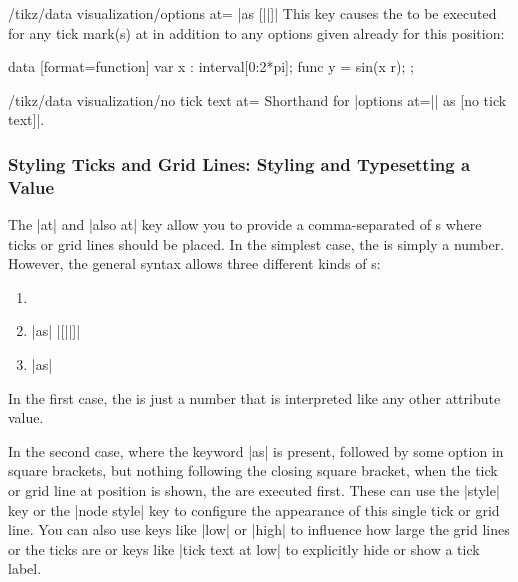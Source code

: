 \begin{key}{/tikz/data visualization/options at= |as [||]|}
  This key causes the  to be executed for any tick
  mark(s) at  in addition to any options given already for
  this position:
\begin{codeexample}[width=7cm]
\tikz \datavisualization [
  scientific axes,
  visualize as smooth line,
  x axis={ticks={major={
    options at = 3    as [no tick text],
    also at    = (pi) as
      [{tick text padding=1ex}] $\pi$}}}]
data [format=function] {
  var x : interval[0:2*pi];
  func y = sin(\value x r);
};
\end{codeexample}
\end{key}

\begin{key}{/tikz/data visualization/no tick text at=}
  Shorthand for |options at=|| as [no tick text]|.  
\end{key}



\subsubsection{Styling Ticks and Grid Lines: Styling and Typesetting a Value}

\label{section-dv-local-styles}
\label{section-dv-tick-labels}


The |at| and |also at| key allow you to provide a comma-separated
 of s where ticks or grid lines should be
placed. In the simplest case, the  is simply a
number. However, the general syntax allows three different kinds of
s: 

\begin{enumerate}
\item
\item
   |as| |[||]|
\item
   |as|  
\end{enumerate}

In the first case, the  is just a number that is
interpreted like any other attribute value.

In the second case, where the keyword |as| is present, followed by
some option in square brackets, but nothing following the closing
square bracket, when the tick or grid line at position  is
shown, the  are executed first. These can use the
|style| key or the |node style| key to configure the appearance of
this single tick or grid line. You can also use keys like |low| or
|high| to influence how large the grid lines or the ticks are or keys
like |tick text at low| to explicitly hide or show a tick label.

